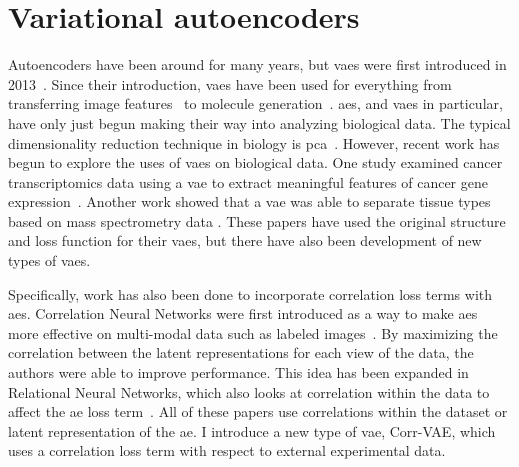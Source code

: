 
\section{Variational autoencoders}
Autoencoders have been around for many years, but \glspl{vae} were first introduced in 2013~\cite{kingma2013auto, rezende2014stochastic}.
Since their introduction, \glspl{vae} have been used for everything from transferring image features~\cite{larsen2015autoencoding} to molecule generation~\cite{gomez2016automatic}.
\glspl{ae}, and \glspl{vae} in particular, have only just begun making their way into analyzing biological data.
The typical dimensionality reduction technique in biology is \gls{pca}~\cite{ringner2008principal}.
However, recent work has begun to explore the uses of \glspl{vae} on biological data.
One study examined cancer transcriptomics data using a \gls{vae} to extract meaningful features of cancer gene expression~\cite{way2017extracting}.
Another work showed that a \gls{vae} was able to separate tissue types based on mass spectrometry data \cite{inglese2017variational}.
These papers have used the original structure and loss function for their \glspl{vae}, but there have also been development of new types of \glspl{vae}.

Specifically, work has also been done to incorporate correlation loss terms with \glspl{ae}.
Correlation Neural Networks were first introduced as a way to make \glspl{ae} more effective on multi-modal data such as labeled images~\cite{chandar2016correlational}.
By maximizing the correlation between the latent representations for each view of the data, the authors were able to improve performance.
This idea has been expanded in Relational Neural Networks, which also looks at correlation within the data to affect the \gls{ae} loss term~\cite{meng2017relational}.
All of these papers use correlations within the dataset or latent representation of the \gls{ae}.
I introduce a new type of \gls{vae}, Corr-VAE, which uses a correlation loss term with respect to external experimental data.
